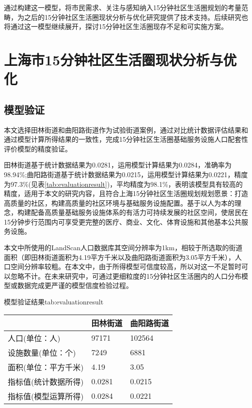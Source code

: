 \documentclass{shnuthesis}
\begin{document}
通过构建这一模型，将市民需求、关注与感知纳入15分钟社区生活圈规划的考量范畴，为之后的15分钟社区生活圈现状分析与优化研究提供了技术支持。后续研究也将通过这一模型继续展开，探讨15分钟社区生活圈现存不足和可实施方案。


\chapter{上海市15分钟社区生活圈现状分析与优化}

\section{模型验证}

本文选择田林街道和曲阳路街道作为试验街道案例，通过对比统计数据评估结果和通过模型计算所得结果的一致性，完成15分钟社区生活圈基础服务设施人口配套性评价模型的精度验证。

田林街道基于统计数据结果为0.0281，运用模型计算结果为0.0284，准确率为98.94\%;曲阳路街道基于统计数据结果为0.0215，运用模型计算结果为0.0221，精度为97.3\%(见表\ref{tab:evaluationresult})，平均精度为98.1\%，表明该模型具有较高的精度，适用于本文的研究内容，且符合上海15分钟社区生活圈规划规划愿景：打造高质量的社区，构建高质量的社区环境与基础服务设施配置。基于以人为本的理念，构建配备高质量基础服务设施体系的有活力可持续发展的社区空间，使居民在15分钟步行范围内可享受更完整的医疗、商业、文化、体育设施和其他基本公共服务设施。

本文中所使用的LandScan人口数据库其空间分辨率为1km，相较于所选取的街道面积（即田林街道面积为4.19平方千米以及曲阳路街道面积为3.05平方千米），人口空间分辨率较粗。在本文中，由于所得模型可信度较高，所以对这一不足暂时可以忽略不计。在未来研究中，可通过更细粒度的15分钟社区生活圈内的人口分布模型或数据完成更严谨的模型信度检验过程。

\begin{generaltab}[htb]{模型验证结果}{tab:evaluationresult}
	\begin{tabularx}{0.9\textwidth}{lP{6cm}P{4cm}}
		\toprule[1.5pt]
		& 田林街道   & 曲阳路街道  \\
		\midrule
		人口(单位：人)    & 97171  & 102564 \\
		设施数量(单位：个)        & 7249   & 6881   \\
		面积(单位：平方千米) & 4.19   & 3.05   \\
		指标值(统计数据所得) & 0.0281 & 0.0215 \\
		指标值(模型运算所得) & 0.0284 & 0.0221 \\
		\bottomrule[1.5pt]
	\end{tabularx}
\end{generaltab}
\end{document}
